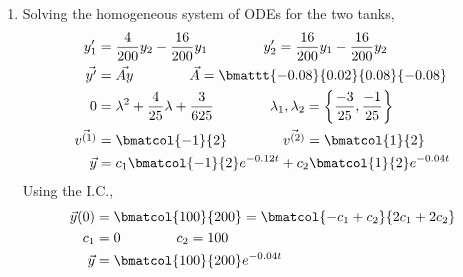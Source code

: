\begin{enumerate}
    \item Solving the homogeneous system of ODEs for the two tanks,
          \begin{align}
              y_1'          & = \frac{4}{200}y_2 - \frac{16}{200}y_1
              \qquad\qquad
              y_2' = \frac{16}{200}y_1 - \frac{16}{200}y_2                          \\
              \vec{y'}      & = \vec{Ay}
              \qquad\qquad
              \vec{A}                           = \bmattt{-0.08}{0.02}{0.08}{-0.08} \\
              0             & = \lambda^{2} + \frac{4}{25}\lambda + \frac{3}{625}
              \qquad\qquad
              \lambda_1, \lambda_2
              = \left\{ \frac{-3}{25}, \frac{-1}{25} \right\}                       \\
              \vec{v^{(1)}} & = \bmatcol{-1}{2}
              \qquad\qquad
              \vec{v^{(2)}} = \bmatcol{1}{2}                                        \\
              \vec{y}       & = c_1 \bmatcol{-1}{2}e^{-0.12t}
              + c_2\bmatcol{1}{2}e^{-0.04t}
          \end{align}
          Using the I.C.,
          \begin{align}
              \vec{y}(0) & = \bmatcol{100}{200} = \bmatcol{-c_1 + c_2}{2c_1 + 2c_2} \\
              c_1        & = 0 \qquad\qquad c_2 = 100                               \\
              \vec{y}    & = \bmatcol{100}{200}e^{-0.04t}
          \end{align}


\end{enumerate}

